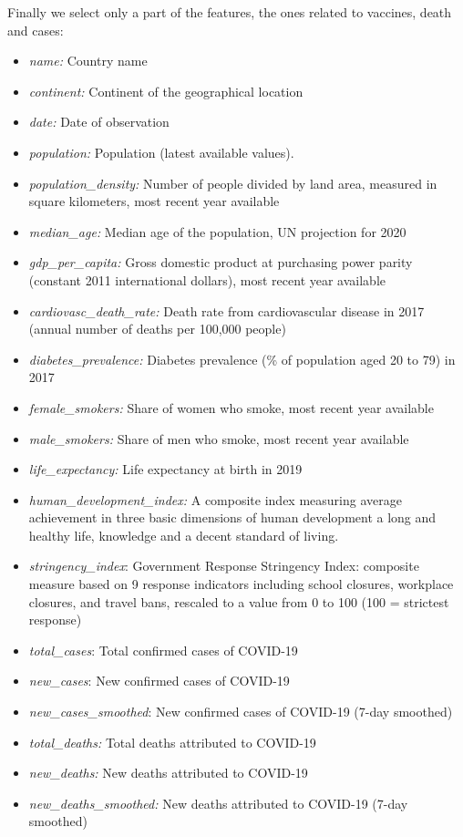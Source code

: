 \documentclass[10pt,conference]{IEEEtran}
\begin{document}
Finally we select only a part of the features, the ones related to vaccines, death and cases:
\begin{itemize}
 \item \emph{name:} Country name
 \item \emph{continent:} Continent of the geographical location
 \item \emph{date:} Date of observation
 
 \item \emph{population:} Population (latest available values).
 \item \emph{population\_density:} Number of people divided by land area, measured in square kilometers, most recent year available
 \item \emph{median\_age:} Median age of the population, UN projection for 2020
 \item \emph{gdp\_per\_capita:} Gross domestic product at purchasing power parity (constant 2011 international dollars), most recent year available
 \item \emph{cardiovasc\_death\_rate:} Death rate from cardiovascular disease in 2017 (annual number of deaths per 100,000 people)
 \item \emph{diabetes\_prevalence:} Diabetes prevalence (\% of population aged 20 to 79) in 2017
 \item \emph{female\_smokers:} Share of women who smoke, most recent year available
 \item \emph{male\_smokers:} Share of men who smoke, most recent year available
 \item \emph{life\_expectancy:} Life expectancy at birth in 2019
 \item \emph{human\_development\_index:} A composite index measuring average achievement in three basic dimensions of human development a long and healthy life, knowledge and a decent standard of living. 
 \item \emph{stringency\_index}: Government Response Stringency Index: composite measure based on 9 response indicators including school closures, workplace closures, and travel bans, rescaled to a value from 0 to 100 (100 = strictest response)
 \item \emph{total\_cases}: Total confirmed cases of COVID-19
 \item \emph{new\_cases}: New confirmed cases of COVID-19
 \item \emph{new\_cases\_smoothed}: New confirmed cases of COVID-19 (7-day smoothed)
 
 \item \emph{total\_deaths:} Total deaths attributed to COVID-19
 \item \emph{new\_deaths:} New deaths attributed to COVID-19
 \item \emph{new\_deaths\_smoothed:} New deaths attributed to COVID-19 (7-day smoothed)


\end{itemize}
\end{document}
